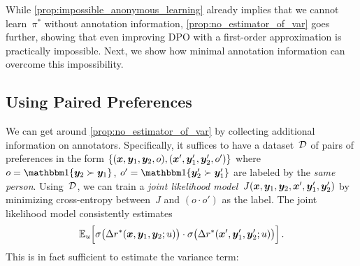 While \cref{prop:impossible_anonymous_learning} already implies that we cannot learn~$\pi^*$ without annotation information, \cref{prop:no_estimator_of_var} goes further, showing that even improving DPO with a first-order approximation is practically impossible. 
\ifarxiv Next, we show how minimal annotation information can overcome this impossibility. \fi



\subsection{Using Paired Preferences}
\label{sec:var_est}

We can get around \cref{prop:no_estimator_of_var} by collecting additional information on annotators. Specifically, it suffices to have a dataset~${\mathcal{D}}$ of pairs of preferences in the form $\{({\bm{x}}, {\bm{y}}_1, {\bm{y}}_2, o), ({\bm{x}}', {\bm{y}}'_1, {\bm{y}}'_2, o')\}$ where $o = \One\{\vy_2 \succ \vy_1\}$, $o' = \One\{\vy'_2 \succ \vy'_1\}$ are labeled by the \emph{same person}. Using~${\mathcal{D}}$, we can train a \emph{joint likelihood model}~$J({\bm{x}}, {\bm{y}}_1, {\bm{y}}_2, {\bm{x}}', {\bm{y}}'_1, {\bm{y}}'_2)$ by minimizing cross-entropy between~$J$ and $(o \cdot o')$ as the label. The joint likelihood model consistently estimates
%
\begin{align*}
    \mathbb{E}_u\Big[\sigma\big(\Delta r^*({\bm{x}}, {\bm{y}}_1, {\bm{y}}_2; u)\big) \cdot \sigma\big(\Delta r^*({\bm{x}}', {\bm{y}}'_1, {\bm{y}}'_2; u)\big)\Big]
    \,.
\end{align*}
%
This is in fact sufficient to estimate the variance term:

